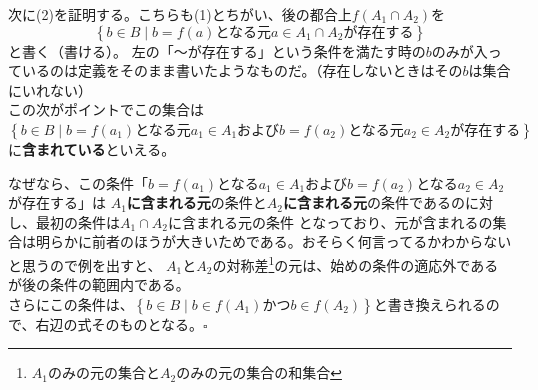 \documentclass[a4j,dvipdfmx]{jsarticle}
\begin{document}

次に(2)を証明する。こちらも(1)とちがい、後の都合上$f(A_1\cap A_2)$を$$\left\{b\in B\mid \text{$b=f(a)$となる元$a\in A_1 \cap A_2$が存在する}\right\}$$と書く（書ける）。
左の「～が存在する」という条件を満たす時の$b$のみが入っているのは定義をそのまま書いたようなものだ。（存在しないときはその$b$は集合にいれない）\\
この次がポイントでこの集合は\\
$\left\{b\in B\mid \text{$b=f(a_1)$となる元$a_1\in A_1$および$b=f(a_2)$となる元$a_2 \in A_2$が存在する}\right\}$\\
に\textbf{含まれている}といえる。

なぜなら、この条件「$b=f(a_1)$となる$a_1\in A_1$および$b=f(a_2)$となる$a_2\in A_2$が存在する」は
\textbf{$A_1$に含まれる元}の条件と\textbf{$A_2$に含まれる元}の条件であるのに対し、最初の条件は$A_1\cap A_2$に含まれる元の条件
となっており、元が含まれるの集合は明らかに前者のほうが大きいためである。おそらく何言ってるかわからないと思うので例を出すと、
$A_1$と$A_2$の対称差\footnote{$A_1$のみの元の集合と$A_2$のみの元の集合の和集合}の元は、始めの条件の適応外であるが後の条件の範囲内である。\\
さらにこの条件は、$\left\{b\in B\mid b\in f(A_1)\text{かつ}b\in f(A_2)\right\}$と書き換えられるので、右辺の式そのものとなる。$\square$
\end{document}
